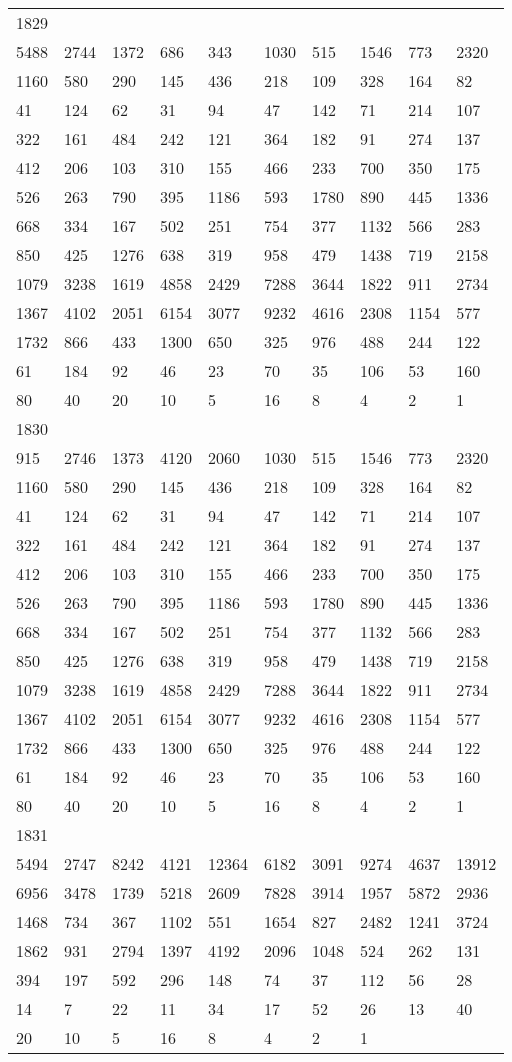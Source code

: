 \begin{longtable}{*{10}{l}}
1829&&&&&&&&&\\
5488& 2744& 1372& 686& 343& 1030& 515& 1546& 773& 2320\\
1160& 580& 290& 145& 436& 218& 109& 328& 164& 82\\
41& 124& 62& 31& 94& 47& 142& 71& 214& 107\\
322& 161& 484& 242& 121& 364& 182& 91& 274& 137\\
412& 206& 103& 310& 155& 466& 233& 700& 350& 175\\
526& 263& 790& 395& 1186& 593& 1780& 890& 445& 1336\\
668& 334& 167& 502& 251& 754& 377& 1132& 566& 283\\
850& 425& 1276& 638& 319& 958& 479& 1438& 719& 2158\\
1079& 3238& 1619& 4858& 2429& 7288& 3644& 1822& 911& 2734\\
1367& 4102& 2051& 6154& 3077& 9232& 4616& 2308& 1154& 577\\
1732& 866& 433& 1300& 650& 325& 976& 488& 244& 122\\
61& 184& 92& 46& 23& 70& 35& 106& 53& 160\\
80& 40& 20& 10& 5& 16& 8& 4& 2& 1\\

1830&&&&&&&&&\\
915& 2746& 1373& 4120& 2060& 1030& 515& 1546& 773& 2320\\
1160& 580& 290& 145& 436& 218& 109& 328& 164& 82\\
41& 124& 62& 31& 94& 47& 142& 71& 214& 107\\
322& 161& 484& 242& 121& 364& 182& 91& 274& 137\\
412& 206& 103& 310& 155& 466& 233& 700& 350& 175\\
526& 263& 790& 395& 1186& 593& 1780& 890& 445& 1336\\
668& 334& 167& 502& 251& 754& 377& 1132& 566& 283\\
850& 425& 1276& 638& 319& 958& 479& 1438& 719& 2158\\
1079& 3238& 1619& 4858& 2429& 7288& 3644& 1822& 911& 2734\\
1367& 4102& 2051& 6154& 3077& 9232& 4616& 2308& 1154& 577\\
1732& 866& 433& 1300& 650& 325& 976& 488& 244& 122\\
61& 184& 92& 46& 23& 70& 35& 106& 53& 160\\
80& 40& 20& 10& 5& 16& 8& 4& 2& 1\\

1831&&&&&&&&&\\
5494& 2747& 8242& 4121& 12364& 6182& 3091& 9274& 4637& 13912\\
6956& 3478& 1739& 5218& 2609& 7828& 3914& 1957& 5872& 2936\\
1468& 734& 367& 1102& 551& 1654& 827& 2482& 1241& 3724\\
1862& 931& 2794& 1397& 4192& 2096& 1048& 524& 262& 131\\
394& 197& 592& 296& 148& 74& 37& 112& 56& 28\\
14& 7& 22& 11& 34& 17& 52& 26& 13& 40\\
20& 10& 5& 16& 8& 4& 2& 1& \\


\end{longtable}

